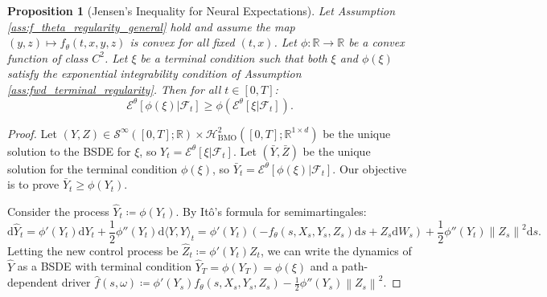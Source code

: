 \documentclass[qian]{imsart}
\newcommand{\R}{\mathbb{R}}
\newcommand{\Fcal}{\mathcal{F}}
\newcommand{\cEneutheta}{\mathcal{E}^{\theta}}
\newcommand{\dd}{\mathrm{d}}
\newcommand{\norm}[1]{\left\lVert#1\right\rVert}
\theoremstyle{plain}
\newtheorem{proposition}[theorem]{Proposition}
\theoremstyle{definition}
\begin{document}
\begin{proposition}[Jensen's Inequality for Neural Expectations]
\label{prop:jensen}
Let Assumption \ref{ass:f_theta_regularity_general} hold and assume the map $(y,z) \mapsto f_\theta(t,x,y,z)$ is convex for all fixed $(t,x)$. Let $\phi: \R \to \R$ be a convex function of class $C^2$. Let $\xi$ be a terminal condition such that both $\xi$ and $\phi(\xi)$ satisfy the exponential integrability condition of Assumption \ref{ass:fwd_terminal_regularity}. Then for all $t \in [0,T]$:
\[ \cEneutheta[\phi(\xi) | \Fcal_t] \ge \phi(\cEneutheta[\xi | \Fcal_t]). \]
\end{proposition}

\begin{proof}
Let $(Y, Z) \in \mathcal{S}^\infty([0,T]; \R) \times \mathcal{H}^2_{\mathrm{BMO}}([0,T]; \R^{1\times d})$ be the unique solution to the BSDE for $\xi$, so $Y_t = \cEneutheta[\xi|\Fcal_t]$. Let $(\bar{Y}, \bar{Z})$ be the unique solution for the terminal condition $\phi(\xi)$, so $\bar{Y}_t = \cEneutheta[\phi(\xi)|\Fcal_t]$. Our objective is to prove $\bar{Y}_t \ge \phi(Y_t)$.

Consider the process $\hat{Y}_t \coloneqq \phi(Y_t)$. By Itô's formula for semimartingales:
\[ \dd \hat{Y}_t = \phi'(Y_t) \dd Y_t + \frac{1}{2}\phi''(Y_t) \dd\langle Y, Y \rangle_t = \phi'(Y_t) \left( -f_\theta(s, X_s, Y_s, Z_s)\dd s + Z_s \dd W_s \right) + \frac{1}{2}\phi''(Y_t) \norm{Z_s}^2 \dd s. \]
Letting the new control process be $\hat{Z}_t \coloneqq \phi'(Y_t)Z_t$, we can write the dynamics of $\hat{Y}$ as a BSDE with terminal condition $\hat{Y}_T = \phi(Y_T) = \phi(\xi)$ and a path-dependent driver $\hat{f}(s, \omega) \coloneqq \phi'(Y_s)f_\theta(s,X_s, Y_s, Z_s) - \frac{1}{2}\phi''(Y_s)\norm{Z_s}^2$.


\end{proof}
\end{document}
